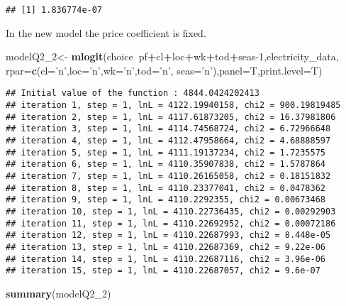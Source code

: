 \documentclass[
]{article}
\newenvironment{Shaded}{\begin{snugshade}}{\end{snugshade}}
\newcommand{\DataTypeTok}[1]{\textcolor[rgb]{0.13,0.29,0.53}{#1}}
\newcommand{\DecValTok}[1]{\textcolor[rgb]{0.00,0.00,0.81}{#1}}
\newcommand{\KeywordTok}[1]{\textcolor[rgb]{0.13,0.29,0.53}{\textbf{#1}}}
\newcommand{\NormalTok}[1]{#1}
\newcommand{\OperatorTok}[1]{\textcolor[rgb]{0.81,0.36,0.00}{\textbf{#1}}}
\newcommand{\StringTok}[1]{\textcolor[rgb]{0.31,0.60,0.02}{#1}}
\begin{document}
\begin{verbatim}
## [1] 1.836774e-07
\end{verbatim}


In the new model the price coefficient is fixed.

\begin{Shaded}
\begin{Highlighting}[]
\NormalTok{modelQ2_}\DecValTok{2}\NormalTok{<-}\StringTok{ }\KeywordTok{mlogit}\NormalTok{(choice}\OperatorTok{~}\NormalTok{pf}\OperatorTok{+}\NormalTok{cl}\OperatorTok{+}\NormalTok{loc}\OperatorTok{+}\NormalTok{wk}\OperatorTok{+}\NormalTok{tod}\OperatorTok{+}\NormalTok{seas}\DecValTok{-1}\NormalTok{,electricity_data, }\DataTypeTok{rpar=}\KeywordTok{c}\NormalTok{(}\DataTypeTok{cl=}\StringTok{'n'}\NormalTok{,}\DataTypeTok{loc=}\StringTok{'n'}\NormalTok{,}\DataTypeTok{wk=}\StringTok{'n'}\NormalTok{,}\DataTypeTok{tod=}\StringTok{'n'}\NormalTok{, }\DataTypeTok{seas=}\StringTok{'n'}\NormalTok{),}\DataTypeTok{panel=}\NormalTok{T,}\DataTypeTok{print.level=}\NormalTok{T)}
\end{Highlighting}
\end{Shaded}

\begin{verbatim}
## Initial value of the function : 4844.0424202413 
## iteration 1, step = 1, lnL = 4122.19940158, chi2 = 900.19819485
## iteration 2, step = 1, lnL = 4117.61873205, chi2 = 16.37981806
## iteration 3, step = 1, lnL = 4114.74568724, chi2 = 6.72966648
## iteration 4, step = 1, lnL = 4112.47958664, chi2 = 4.68888597
## iteration 5, step = 1, lnL = 4111.19137234, chi2 = 1.7235575
## iteration 6, step = 1, lnL = 4110.35907838, chi2 = 1.5787864
## iteration 7, step = 1, lnL = 4110.26165058, chi2 = 0.18151832
## iteration 8, step = 1, lnL = 4110.23377041, chi2 = 0.0478362
## iteration 9, step = 1, lnL = 4110.2292355, chi2 = 0.00673468
## iteration 10, step = 1, lnL = 4110.22736435, chi2 = 0.00292903
## iteration 11, step = 1, lnL = 4110.22692952, chi2 = 0.00072186
## iteration 12, step = 1, lnL = 4110.22687993, chi2 = 8.448e-05
## iteration 13, step = 1, lnL = 4110.22687369, chi2 = 9.22e-06
## iteration 14, step = 1, lnL = 4110.22687116, chi2 = 3.96e-06
## iteration 15, step = 1, lnL = 4110.22687057, chi2 = 9.6e-07
\end{verbatim}

\begin{Shaded}
\begin{Highlighting}[]
\KeywordTok{summary}\NormalTok{(modelQ2_}\DecValTok{2}\NormalTok{)}
\end{Highlighting}
\end{Shaded}
\end{document}
